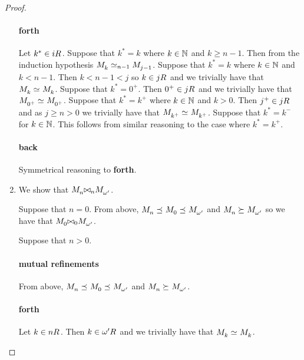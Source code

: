 \begin{proof}
\begin{enumerate}
    \paragraph{forth}

    Let $k^* \in \kSuccessors{}{i}$.
    Suppose that $k^* = k$ where $k \in \mathbb{N}$ and $k \geq n - 1$.
    Then from the induction hypothesis $\kPModel{k} \bisimilar [n-1] \kPModel{j - 1}$.
    Suppose that $k^* = k$ where $k \in \mathbb{N}$ and $k < n - 1$.
    Then $k < n - 1 < j$ so $k \in \kSuccessors{}{j}$ and we trivially have that $\kPModel{k} \bisimilar \kPModel{k}$.
    Suppose that $k^* = 0^+$.
    Then $0^+ \in \kSuccessors{}{j}$ and we trivially have that $\kPModel{0^+} \bisimilar \kPModel{0^+}$.
    Suppose that $k^* = k^+$ where $k \in \mathbb{N}$ and $k > 0$.
    Then $j^+ \in \kSuccessors{}{j}$ and as $j \geq n > 0$ we trivially have that $\kPModel{k^+} \bisimilar \kPModel{k^+}$.
    Suppose that $k^* = k^-$ for $k \in \mathbb{N}$. This follows from similar reasoning to the case where $k^* = k^+$.

    \paragraph{back}

    Symmetrical reasoning to {\bf forth}.

    \item We show that $\kPModel{n} \bisimref[n] \kPModel{\omega'}$.

    Suppose that $n = 0$. 
    From above, $\kPModel{n} \refines \kPModel{0} \refines \kPModel{\omega'}$ and $\kPModel{n} \simulates \kPModel{\omega'}$ so we have that $\kPModel{0} \bisimref[0] \kPModel{\omega'}$.

    Suppose that $n > 0$.

    \paragraph{mutual refinements}

    From above, $\kPModel{n} \refines \kPModel{0} \refines \kPModel{\omega'}$ and $\kPModel{n} \simulates \kPModel{\omega'}$.

    \paragraph{forth}

    Let $k \in \kSuccessors{}{n}$. 
    Then $k \in \kSuccessors{}{\omega'}$ and we trivially have that $\kPModel{k} \bisimilar \kPModel{k}$.


\end{enumerate}
\end{proof}
